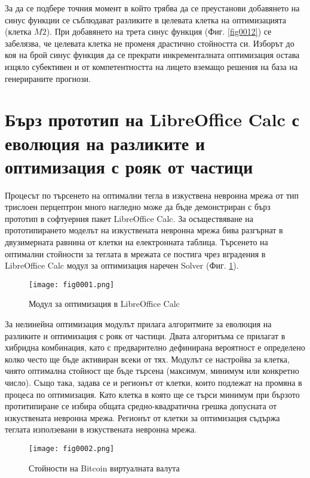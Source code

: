 За да се подбере точния момент в който трябва да се преустанови добавянето на синус функции се съблюдават разликите в целевата клетка на оптимизацията (клетка $M2$). При добавянето на трета синус функция (Фиг. \ref{fig0012}) се забелязва, че целевата клетка не променя драстично стойността си. Изборът до коя на брой синус функция да се прекрати инкременталната оптимизация остава изцяло субективен и от компетентността на лицето вземащо решения на база на генерираните прогнози. 

\section{Бърз прототип на LibreOffice Calc с еволюция на разликите и оптимизация с рояк от частици}

Процесът по търсенето на оптимални тегла в изкуствена невронна мрежа от тип трислоен перцептрон много нагледно може да бъде демонстриран с бърз прототип в софтуерния пакет LibreOffice Calc. За осъществяване на прототипирането моделът на изкуствената невронна мрежа бива разгърнат в двузимерната равнина от клетки на електронната таблица. Търсенето на оптимални стойности за теглата в мрежата се постига чрез вградения в LibreOffice Calc модул за оптимизация наречен Solver (Фиг. \ref{fig001}).

\begin{figure}[H]
  \centering
  \texttt{[image: fig0001.png]}
  \caption{Модул за оптимизация в LibreOffice Calc}
\label{fig001}
\end{figure}

За нелинейна оптимизация модулът прилага алгоритмите за еволюция на разликите и оптимизация с рояк от частици. Двата алгоритъма се прилагат в хибридна комбинация, като с предварително дефинирана вероятност е определено колко често ще бъде активиран всеки от тях. Модулът се настройва за клетка, чиято оптимална стойност ще бъде търсена (максимум, минимум или конкретно число). Също така, задава се и регионът от клетки, които подлежат на промяна в процеса по оптимизация. Като клетка в която ще се търси минимум при бързото протитипиране се избира общата средно-квадратична грешка допусната от изкуствената невронна мрежа. Регионът от клетки за оптимизация съдържа теглата използевани в изкуствената невронна мрежа. 

\begin{figure}[H]
  \centering
  \texttt{[image: fig0002.png]}
  \caption{Стойности на Bitcoin виртуалната валута}
\label{fig002}
\end{figure}


